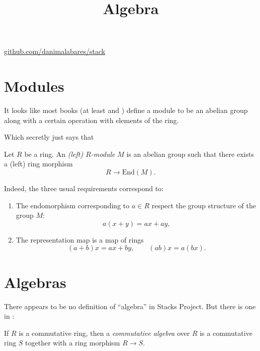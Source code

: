 



\title{Algebra}
\maketitle

\label{section-phantom}
\hfill
\href{http://github.com/danimalabares/stack}{github.com/danimalabares/stack}

\tableofcontents

\section{Modules}
\label{section-modules}

It looks like most books (at least
\cite{eis} and \cite{Samuel-Zariski-Vol1})
define a module to be an abelian group
along with a certain operation with
elements of the ring.

Which secretly just says that

\begin{definition}
\label{definition-module}
Let $R$ be a ring.
An {\it (left) $R$-module} $M$ is an abelian group
such that there exists a (left) ring morphism
$$
R \to \text{End}(M).
$$
\end{definition}

\noindent
Indeed, the three usual requirements
correspond to:

\begin{enumerate}
\item The endomorphism corresponding to $a \in R$ 
respect the group structure of the group $M$:
$$
a(x+y)=ax+ay,
$$

\item The representation map is a map of rings
$$
(a+b)x=ax+by,\qquad (ab)x=a(bx).
$$
\end{enumerate}

\noindent


\section{Algebras}
\label{section-algebras}

\noindent
There appears to be no definition of ``algebra''
in Stacks Project.
But there is one in \cite{Eisenbud}:

\begin{definition}
\label{definition-algebra}
If $R$ is a commutative ring,
then a {\it commutative algebra} over $R$ 
is a commutative ring $S$ together
with a ring morphism $R \to S$.
\end{definition}

